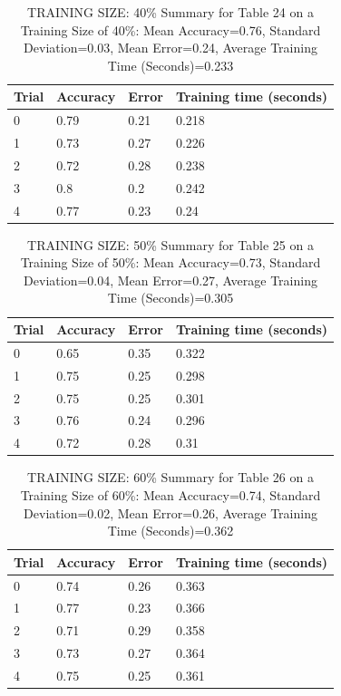 \documentclass{article}
\begin{document}
\begin{table}[H]

\centering
{\begin{tabular}{||p{1cm}|p{1.8cm}|p{1.8cm}|p{3cm}||}
 \hline
Trial & Accuracy & Error & Training time (seconds) \\ [0.5ex] 
 \hline\hline
   0 & 0.79 & 0.21 & 0.218\\
\hline
   1 & 0.73 & 0.27 & 0.226\\
\hline
   2 & 0.72 & 0.28 & 0.238\\
\hline
   3 & 0.8 & 0.2 & 0.242\\
\hline
   4 & 0.77 & 0.23 & 0.24\\
\hline
\end{tabular}}
\caption{TRAINING SIZE: 40\% \newline Summary for Table 24 on a Training Size of 40\%: Mean Accuracy=0.76, Standard Deviation=0.03, Mean Error=0.24, Average Training Time (Seconds)=0.233}
\end{table} 

\begin{table}[H]

\centering
{\begin{tabular}{||p{1cm}|p{1.8cm}|p{1.8cm}|p{3cm}||}
 \hline
Trial & Accuracy & Error & Training time (seconds) \\ [0.5ex] 
 \hline\hline
   0 & 0.65 & 0.35 & 0.322\\
\hline
   1 & 0.75 & 0.25 & 0.298\\
\hline
   2 & 0.75 & 0.25 & 0.301\\
\hline
   3 & 0.76 & 0.24 & 0.296\\
\hline
   4 & 0.72 & 0.28 & 0.31\\
\hline
\end{tabular}}
\caption{TRAINING SIZE: 50\% \newline Summary for Table 25 on a Training Size of 50\%: Mean Accuracy=0.73, Standard Deviation=0.04, Mean Error=0.27, Average Training Time (Seconds)=0.305}
\end{table} 

\begin{table}[H]

\centering
{\begin{tabular}{||p{1cm}|p{1.8cm}|p{1.8cm}|p{3cm}||}
 \hline
Trial & Accuracy & Error & Training time (seconds) \\ [0.5ex] 
 \hline\hline
   0 & 0.74 & 0.26 & 0.363\\
\hline
   1 & 0.77 & 0.23 & 0.366\\
\hline
   2 & 0.71 & 0.29 & 0.358\\
\hline
   3 & 0.73 & 0.27 & 0.364\\
\hline
   4 & 0.75 & 0.25 & 0.361\\
\hline
\end{tabular}}
\caption{TRAINING SIZE: 60\% \newline Summary for Table 26 on a Training Size of 60\%: Mean Accuracy=0.74, Standard Deviation=0.02, Mean Error=0.26, Average Training Time (Seconds)=0.362}
\end{table} 
\end{document}
